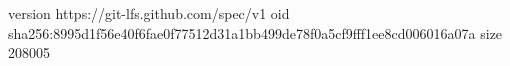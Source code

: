 version https://git-lfs.github.com/spec/v1
oid sha256:8995d1f56e40f6fae0f77512d31a1bb499de78f0a5cf9fff1ee8cd006016a07a
size 208005
